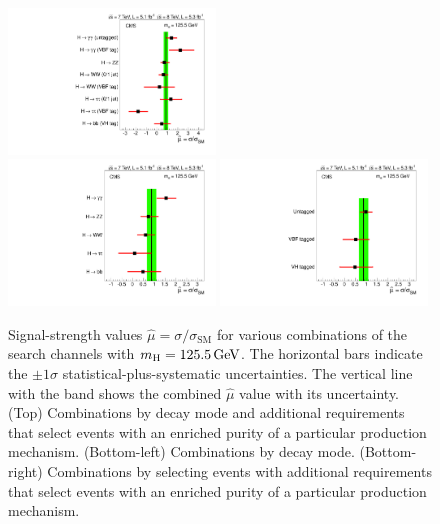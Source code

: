 \documentclass[12pt,twoside,a4paper,cmspaper,final,collab]{cms-tdr}
\begin{document}
\begin{figure} [htbp]
\centering
\includegraphics[width=0.49\textwidth]{figures/comb/sqr_mlzs_ccc_mH125p5_all} \\
\includegraphics[width=0.49\textwidth]{figures/comb/sqr_mlzs_ccc_mH125p5_decay}\hfill
\includegraphics[width=0.49\textwidth]{figures/comb/sqr_mlzs_ccc_mH125p5_prod}
\caption{
	Signal-strength values $\hat \mu = \sigma / \sigma_\mathrm{SM}$
	for various combinations of the search channels with $m_{\mathrm{H}}=125.5\,\text{Ge\hspace{-.08em}V}$.
	The horizontal bars indicate the $\pm 1 \sigma$ statistical-plus-systematic uncertainties.
	The  vertical line with the band shows the combined $\hat \mu$ value with its uncertainty.
(Top) Combinations by decay mode and additional requirements
      that select events with an enriched purity of a particular production mechanism.
(Bottom-left) Combinations by decay mode.
(Bottom-right) Combinations by selecting events with additional requirements that select events with an enriched purity of a
 particular production mechanism.
    }
\label{fig:muhat_compatibility}
\end{figure}
\end{document}
